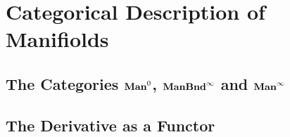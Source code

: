 \documentclass{book}
\begin{document}
	
	
	
	
	
	
	
	
	
	
	
	
	
	
	\newpage
	\chapter{Categorical Description of Manifiolds}
	
	\section{The Categories $\Man0$, $\operatorname*{\text{\textbf{ManBnd}}^{\infty}}$ and $\operatorname*{\text{\textbf{Man}}^{\infty}}$}
	
	
	
	
	
	
	
	
	
	
	
	
	
	
	
	
	
	
	
	
	
	
	
	
	
	
	
	
	
	
	
	
	
	
	
	
	
	
	
	
	
	
	
	
	\section{The Derivative as a Functor}
	
	
	
	
	
	
	
	
	
	
	
	
	
	
	
	
	
	
	
	
	
	
	
	
	
	
	
	
	
\end{document}
